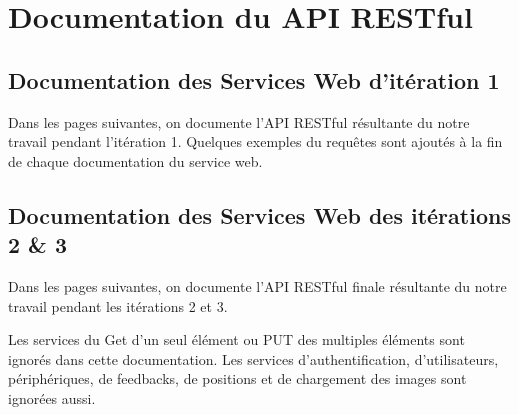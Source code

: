 \chapter{Documentation du API RESTful}

\setlength{\aboverulesep}{0pt}
\setlength{\belowrulesep}{0pt}

\section{Documentation des Services Web d'itération 1}

Dans les pages suivantes, on documente l'API RESTful résultante du notre
travail pendant l'itération 1. Quelques exemples du requêtes sont ajoutés à la
fin de chaque documentation du service web.

\clearpage

\clearpage


\clearpage
\section{Documentation des Services Web des itérations 2 \& 3}
\label{sec:sprint2-webservices-doc}

Dans les pages suivantes, on documente l'API RESTful finale résultante du notre
travail pendant les itérations 2 et 3.

Les services du Get d'un seul élément ou PUT des multiples éléments sont
ignorés dans cette documentation. Les services d'authentification,
d'utilisateurs, périphériques, de feedbacks, de positions et de chargement des
images sont ignorées aussi.









